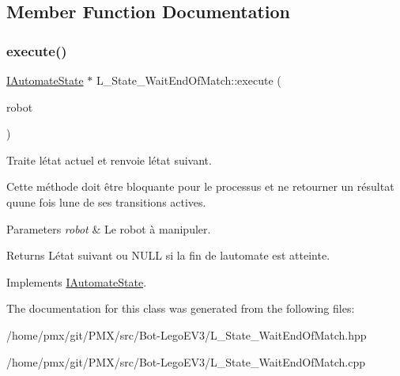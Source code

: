 \subsection{Member Function Documentation}
\mbox{\label{classL__State__WaitEndOfMatch_a537e556e995b79725420de71b6ecce19}} 
\subsubsection{\texorpdfstring{execute()}{execute()}}
{\footnotesize\ttfamily \hyperlink{classIAutomateState}{I\+Automate\+State} $\ast$ L\+\_\+\+State\+\_\+\+Wait\+End\+Of\+Match\+::execute (\begin{DoxyParamCaption}\item[{\hyperlink{classRobot}{Robot} \&}]{robot }\end{DoxyParamCaption})\hspace{0.3cm}{\ttfamily [virtual]}}



Traite l\textquotesingle{}état actuel et renvoie l\textquotesingle{}état suivant. 

Cette méthode doit être bloquante pour le processus et ne retourner un résultat qu\textquotesingle{}une fois l\textquotesingle{}une de ses transitions actives.


\begin{DoxyParams}{Parameters}
{\em robot} & Le robot à manipuler. \\
\hline
\end{DoxyParams}
\begin{DoxyReturn}{Returns}
L\textquotesingle{}état suivant ou {\ttfamily N\+U\+LL} si la fin de l\textquotesingle{}automate est atteinte. 
\end{DoxyReturn}


Implements \hyperlink{classIAutomateState_a58bf3c2c5b55f7ba3fc1783fc36e102b}{I\+Automate\+State}.



The documentation for this class was generated from the following files\+:\begin{DoxyCompactItemize}
\item 
/home/pmx/git/\+P\+M\+X/src/\+Bot-\/\+Lego\+E\+V3/L\+\_\+\+State\+\_\+\+Wait\+End\+Of\+Match.\+hpp\item 
/home/pmx/git/\+P\+M\+X/src/\+Bot-\/\+Lego\+E\+V3/L\+\_\+\+State\+\_\+\+Wait\+End\+Of\+Match.\+cpp\end{DoxyCompactItemize}
